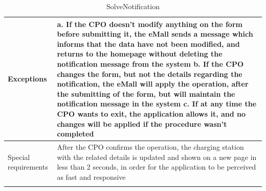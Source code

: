 \begin{center}
\begin{longtable}{p{4cm} p{11cm}}
     \hline
     Exceptions &   a. If the CPO doesn't modify anything on the form before submitting it, the eMall sends a                       message which informs that the data have not been modified, and returns to the homepage without                 deleting the notification message from the system \newline
                    b. If the CPO changes the form, but not the details regarding the notification, the eMall will apply the operation, after the submitting of the form, but will maintain the notification message in the system \newline 
                    c. If at any time the CPO wants to exit, the application allows it, and no changes will be applied if the procedure wasn't completed \\
     \hline
     Special requirements & After the CPO confirms the operation, the charging station with the related details is updated and shown on a new page in less than 2 seconds, in order for the application to be perceived as fast and responsive \\
     \hline
    \caption{SolveNotification}
    \label{tab:SolveNotification}
    \end{longtable}
\end{center}

